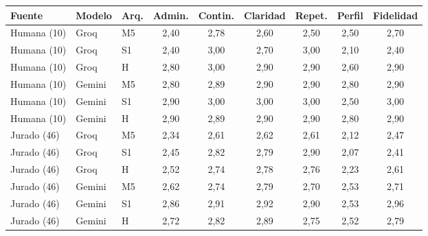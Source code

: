 \begin{tabular}{lllcccccc}\toprule
Fuente & Modelo & Arq. & Admin. & Contin. & Claridad & Repet. & Perfil & Fidelidad \\ \midrule
Humana (10) & Groq & M5 & 2,40 & 2,78 & 2,60 & 2,50 & 2,50 & 2,70 \\
Humana (10) & Groq & S1 & 2,40 & 3,00 & 2,70 & 3,00 & 2,10 & 2,40 \\
Humana (10) & Groq & H & 2,80 & 3,00 & 2,90 & 2,90 & 2,60 & 2,90 \\
Humana (10) & Gemini & M5 & 2,80 & 2,89 & 2,90 & 2,90 & 2,80 & 2,90 \\
Humana (10) & Gemini & S1 & 2,90 & 3,00 & 3,00 & 3,00 & 2,50 & 3,00 \\
Humana (10) & Gemini & H & 2,90 & 2,89 & 2,90 & 2,90 & 2,80 & 2,90 \\
\midrule
Jurado (46) & Groq & M5 & 2,34 & 2,61 & 2,62 & 2,61 & 2,12 & 2,47 \\
Jurado (46) & Groq & S1 & 2,45 & 2,82 & 2,79 & 2,90 & 2,07 & 2,41 \\
Jurado (46) & Groq & H & 2,52 & 2,74 & 2,78 & 2,76 & 2,23 & 2,61 \\
Jurado (46) & Gemini & M5 & 2,62 & 2,74 & 2,79 & 2,70 & 2,53 & 2,71 \\
Jurado (46) & Gemini & S1 & 2,86 & 2,91 & 2,92 & 2,90 & 2,53 & 2,96 \\
Jurado (46) & Gemini & H & 2,72 & 2,82 & 2,89 & 2,75 & 2,52 & 2,79 \\
\bottomrule\end{tabular}
